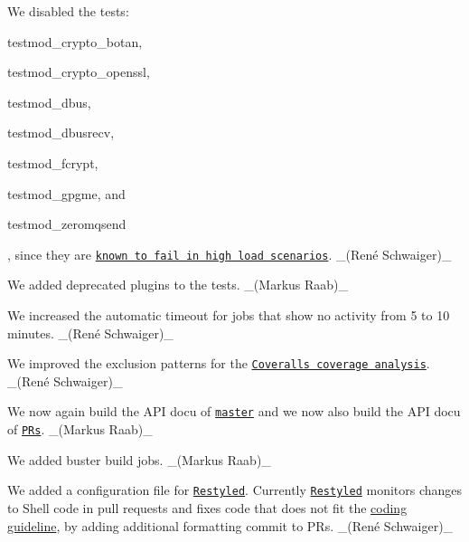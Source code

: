 \begin{DoxyItemize}
\item We disabled the tests\+:
\begin{DoxyItemize}
\item {\ttfamily testmod\+\_\+crypto\+\_\+botan},
\item {\ttfamily testmod\+\_\+crypto\+\_\+openssl},
\item {\ttfamily testmod\+\_\+dbus},
\item {\ttfamily testmod\+\_\+dbusrecv},
\item {\ttfamily testmod\+\_\+fcrypt},
\item {\ttfamily testmod\+\_\+gpgme}, and
\item {\ttfamily testmod\+\_\+zeromqsend}
\end{DoxyItemize}

, since they are \href{https://issues.libelektra.org/2439}{\tt known to fail in high load scenarios}. \+\_\+(René Schwaiger)\+\_\+
\item We added deprecated plugins to the tests. \+\_\+(\+Markus Raab)\+\_\+
\item We increased the automatic timeout for jobs that show no activity from 5 to 10 minutes. \+\_\+(René Schwaiger)\+\_\+
\item We improved the exclusion patterns for the \href{https://coveralls.io/github/ElektraInitiative/libelektra}{\tt Coveralls coverage analysis}. \+\_\+(René Schwaiger)\+\_\+
\item We now again build the A\+PI docu of \href{https://doc.libelektra.org/api/master}{\tt master} and we now also build the A\+PI docu of \href{https://doc.libelektra.org/api/pr/}{\tt P\+Rs}. \+\_\+(\+Markus Raab)\+\_\+
\item We added buster build jobs. \+\_\+(\+Markus Raab)\+\_\+
\end{DoxyItemize}


\begin{DoxyItemize}
\item We added a configuration file for \href{https://restyled.io}{\tt Restyled}. Currently \href{https://restyled.io}{\tt Restyled} monitors changes to Shell code in pull requests and fixes code that does not fit the \hyperlink{doc_CODING_md}{coding guideline}, by adding additional formatting commit to P\+Rs. \+\_\+(René Schwaiger)\+\_\+
\end{DoxyItemize}


